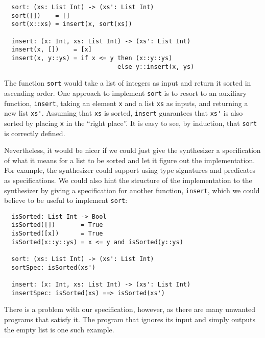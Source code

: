 

\begin{lstlisting}
  sort: (xs: List Int) -> (xs': List Int)
  sort([])    = []
  sort(x::xs) = insert(x, sort(xs))

  insert: (x: Int, xs: List Int) -> (xs': List Int)
  insert(x, [])    = [x]
  insert(x, y::ys) = if x <= y then (x::y::ys)
                               else y::insert(x, ys)
\end{lstlisting}

The function \lstinline{sort} would take a list of integers as input and return
it sorted in ascending order. One approach to implement \lstinline{sort} is to
resort to an auxiliary function, \lstinline{insert}, taking an element
\lstinline{x} and a list \lstinline{xs} as inputs, and returning a new list
\lstinline{xs'}. Assuming that \lstinline{xs} is sorted, \lstinline{insert}
guarantees that \lstinline{xs'} is also sorted by placing \lstinline{x} in the
``right place''. It is easy to see, by induction, that \lstinline{sort} is
correctly defined.

Nevertheless, it would be nicer if we could just give the synthesizer a
specification of what it means for a list to be sorted and let it figure out the
implementation. For example, the synthesizer could support using type signatures
and predicates as specifications. We could also hint the structure of the
implementation to the synthesizer by giving a specification for another
function, \lstinline{insert}, which we could believe to be useful to implement
\lstinline{sort}:

\begin{lstlisting}
  isSorted: List Int -> Bool
  isSorted([])       = True
  isSorted([x])      = True
  isSorted(x::y::ys) = x <= y and isSorted(y::ys)

  sort: (xs: List Int) -> (xs': List Int)
  sortSpec: isSorted(xs')

  insert: (x: Int, xs: List Int) -> (xs': List Int)
  insertSpec: isSorted(xs) ==> isSorted(xs')
\end{lstlisting}

There is a problem with our specification, however, as there are many unwanted
programs that satisfy it. The program that ignores its input and simply outputs
the empty list is one such example.

